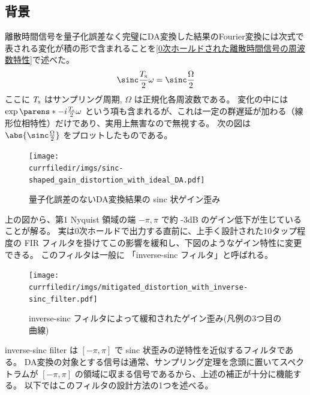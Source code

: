         \subsection{背景}
            離散時間信号を量子化誤差なく完璧にDA変換した結果のFourier変換には次式で表される変化が積の形で含まれることを\ref{0次ホールドされた離散時間信号の周波数特性}で述べた。
            \[ \sinc \frac{\Ts}{2}\omega = \sinc \frac{\Omega}{2} \]
            ここに $T_\text{s}$ はサンプリング周期, $\Omega$ は正規化各周波数である。
            変化の中には $\exp\parens*{-i\frac{\Ts}{2}\omega}$ という項も含まれるが、これは一定の群遅延が加わる（線形位相特性）だけであり、実用上無害なので無視する。
            次の図は $\abs{\sinc \frac{\Omega}{2}}$ をプロットしたものである。
            \begin{figure}[H]
                \centering
                \texttt{[image: \\currfiledir/imgs/sinc-shaped\_gain\_distortion\_with\_ideal\_DA.pdf]}
                \caption{量子化誤差のないDA変換結果の sinc 状ゲイン歪み}
            \end{figure}
            上の図から、第1 Nyquist 領域の端 $-\pi, \pi$ で約 -3dB のゲイン低下が生じていることが解る。
            実は0次ホールドで出力する直前に、上手く設計された10タップ程度の FIR フィルタを掛けてこの影響を緩和し、下図のようなゲイン特性に変更できる。
            このフィルタは一般に 「inverse-sinc フィルタ」と呼ばれる。
            \begin{figure}[H]
                \centering
                \texttt{[image: \\currfiledir/imgs/mitigated\_distortion\_with\_inverse-sinc\_filter.pdf]}
                \caption{inverse-sinc フィルタによって緩和されたゲイン歪み(凡例の3つ目の曲線)}
                \label{inverse-sinc フィルタによって緩和されたゲイン歪み}
            \end{figure}
            inverse-sinc filter は $[-\pi, \pi]$ で sinc 状歪みの逆特性を近似するフィルタである。
            DA変換の対象とする信号は通常、サンプリング定理を念頭に置いてスペクトラムが $[-\pi,\pi]$ の領域に収まる信号であるから、上述の補正が十分に機能する。
            以下ではこのフィルタの設計方法の1つを述べる。
